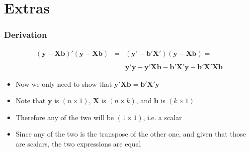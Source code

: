 \documentclass[10pt]{beamer}
\theoremstyle{definition}
\begin{document}
\appendix
\section{Extras}
\begin{frame}[fragile]
	\frametitle{Derivation}
	\label{deriv}
	\hyperlink{mainslide}{}
	\vspace{0.5cm}
	\[
	\begin{array}{lcl}
		\mathbf{(y - Xb)'(y - Xb)} & = & \mathbf{(y' - b'X')(y - Xb)} = \\
		\quad\\
		& = & \mathbf{y'y - y'Xb - b'X'y - b'X'Xb} 
	\end{array}
	\]
	\begin{itemize}
		\item Now we only need to show that $\mathbf{y'Xb = b'X'y}$
		
		\item Note that $\mathbf{y}$ is $(n \times 1)$, $\mathbf{X}$ is $(n\times k)$, and $\mathbf{b}$ is $(k\times 1)$
		
		\item Therefore any of the two will be $(1\times 1)$, i.e. a scalar
		
		\item Since any of the two is the transpose of the other one, and given that those are scalars, the two expressions are equal
	\end{itemize}
\end{frame}
\end{document}

